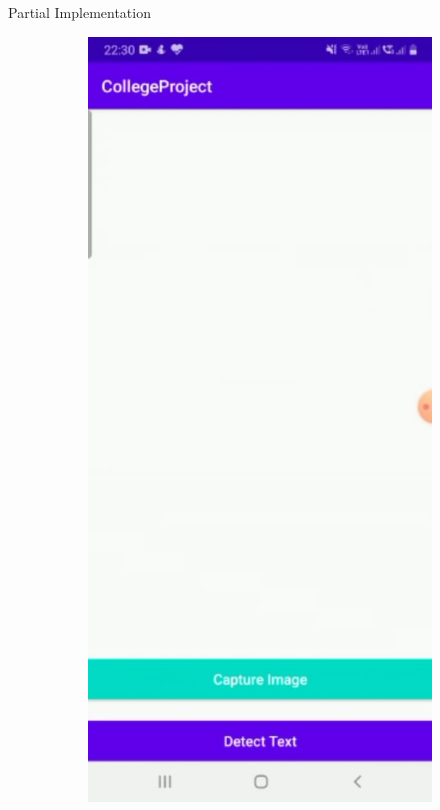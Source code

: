 \documentclass{beamer}
\begin{document}
\begin{frame}[allowframebreaks]{Partial Implementation}
\begin{figure}
\begin{subfigure}[b]{0.2\linewidth}
			\label{App}
	\end{subfigure}
	\begin{subfigure}[b]{0.2\linewidth}
			{\includegraphics[width=\linewidth]{App_2}}

\end{subfigure}
\end{figure}
\end{frame}
\end{document}
